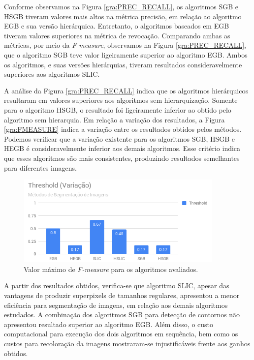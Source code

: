 \begin{document}
Conforme observamos na Figura \ref{gra:PREC_RECALL}, os algoritmos SGB e HSGB tiveram valores mais altos na métrica precisão, em relação ao algoritmo EGB e sua versão hierárquica. Entretanto, o algoritmos baseados em EGB tiveram valores superiores na métrica de revocação. Comparando ambas as métricas, por meio da \textit{F-measure}, observamos na Figura \ref{gra:PREC_RECALL}, que o algoritmo SGB teve valor ligeiramente superior ao algoritmo EGB. Ambos os algoritmos, e suas versões hierárquias, tiveram resultados consideravelmente superiores aos algoritmos SLIC.

A análise da Figura \ref{gra:PREC_RECALL} indica que os algoritmos hierárquicos resultaram em valores superiores aos algoritmos sem hierarquização. Somente para o algoritmo HSGB, o resultado foi ligeiramente inferior ao obtido pelo algoritmo sem hierarquia. Em relação a variação dos resultados, a Figura \ref{gra:FMEASURE} indica a variação entre os resultados obtidos pelos métodos. Podemos verificar que a variação existente para os algoritmos SGB, HSGB e HEGB é consideravelmente inferior aos demais algoritmos. Esse critério indica que esses algoritmos são mais consistentes, produzindo resultados semelhantes para diferentes imagens.

\begin{figure}[ht]
\centering
\includegraphics[width=0.9\textwidth]{graph_threshold.png}
\caption{Valor máximo de \textit{F-measure} para os algoritmos avaliados.}
\label{gra:THRESHOLD}
\end{figure}

A partir dos resultados obtidos, verifica-se que algoritmo SLIC, apesar das vantagens de produzir superpixels de tamanhos regulares, apresentou a menor eficiência para segmentação de imagens, em relação aos demais algoritmos estudados. A combinação dos algoritmos SGB para detecção de contornos não apresentou resultado superior ao algoritmo EGB. Além disso, o custo computacional para execução dos dois algoritmos em sequência, bem como os custos para recoloração da imagens mostraram-se injustificáveis frente aos ganhos obtidos.
\end{document}
